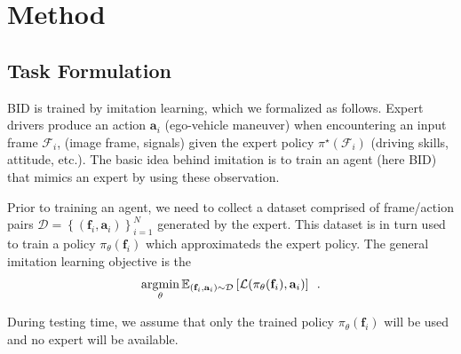 \section{Method}

\subsection{Task Formulation}

\hspace{1pc}BID is trained by imitation learning, which we formalized as follows.
Expert drivers produce an action $\mathbf{a}_{i}$ (ego-vehicle maneuver) when encountering an input frame $\mathcal{F}_i$, (image frame, signals) given the expert policy $\pi^{\star}(\mathcal{F}_{i})$ (driving skills, attitude, etc.).
The basic idea behind imitation is to train an agent (here BID) that mimics an expert by using these observation.


Prior to training an agent, we need to collect a dataset comprised of frame/action pairs $\mathcal{D} = \left\{(\mathbf{f}_{i}, \mathbf{a}_{i})\right\}_{i=1}^N$ generated by the expert.
This dataset is in turn used to train a policy $\pi_{\theta}(\mathbf{f}_{i})$ which approximateds the expert policy.
The general imitation learning objective is the 
\begin{equation} \label{eq:target}
	\operatorname*{\arg\!\min}_{\theta} \mathbb{E}_{(\mathbf{f}_{i}, \mathbf{a}_{i})\sim \mathcal{D}} \left[ \mathcal{L}(\pi_{\theta}(\mathbf{f}_{i}), \mathbf{a}_{i}) \right] \enspace .
\end{equation}

During testing time, we assume that only the trained policy $\pi_{\theta}(\mathbf{f}_{i})$ will be used and no expert will be available.

